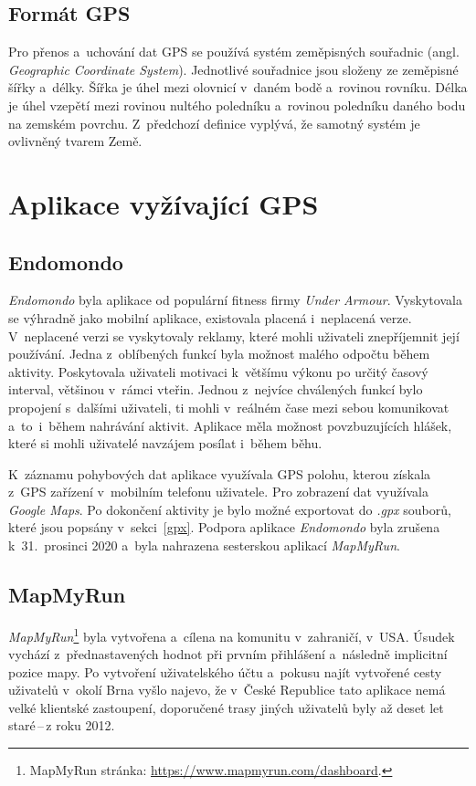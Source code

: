 \subsection{Formát GPS}
Pro přenos a~uchování dat GPS se používá systém zeměpisných souřadnic (angl. \emph{Geographic Coordinate System}). Jednotlivé souřadnice jsou složeny ze zeměpisné šířky a~délky. Šířka je úhel mezi olovnicí v~daném bodě a~rovinou rovníku. Délka je úhel vzepětí mezi rovinou nultého poledníku a~rovinou poledníku daného bodu na zemském povrchu. Z~předchozí definice vyplývá, že samotný systém je ovlivněný tvarem Země.~\cite{gcs}

\section{Aplikace vyžívající GPS} 
\label{appcomparison}
\subsection{Endomondo}
\emph{Endomondo} byla aplikace od populární fitness firmy \emph{Under Armour}. Vyskytovala se výhradně jako mobilní aplikace, existovala placená i~neplacená verze. V~neplacené verzi se vyskytovaly reklamy, které mohli uživateli znepříjemnit její používání. Jedna z~oblíbených funkcí byla možnost malého odpočtu během aktivity. Poskytovala uživateli motivaci k~většímu výkonu po určitý časový interval, většinou v~rámci vteřin. Jednou z~nejvíce chválených funkcí bylo propojení s~dalšími uživateli, ti mohli v~reálném čase mezi sebou komunikovat a~to~i~během nahrávání aktivit. Aplikace měla možnost povzbuzujících hlášek, které si mohli uživatelé navzájem posílat i~během běhu. \cite{endomondo} 

K~záznamu pohybových dat aplikace využívala GPS polohu, kterou získala z~GPS zařízení v~mobilním telefonu uživatele. Pro zobrazení dat využívala \emph{Google Maps}. Po dokončení aktivity je bylo možné exportovat do \emph{.gpx} souborů, které jsou popsány v~sekci~\ref{gpx}. Podpora aplikace \emph{Endomondo} byla zrušena k~31.~prosinci 2020 a~byla nahrazena sesterskou aplikací \emph{MapMyRun}. \cite{endomondo}


\subsection{MapMyRun}
\emph{MapMyRun}\footnote{MapMyRun stránka: \url{https://www.mapmyrun.com/dashboard}.} byla vytvořena a~cílena na komunitu v~zahraničí, v~USA. Úsudek vychází z~přednastavených hodnot při prvním přihlášení a~následně implicitní pozice mapy.
Po vytvoření uživatelského účtu a~pokusu najít vytvořené cesty uživatelů v~okolí Brna vyšlo najevo, že v~České Republice tato aplikace nemá velké klientské zastoupení, doporučené trasy jiných uživatelů byly až deset let staré\,--\,z roku 2012.

